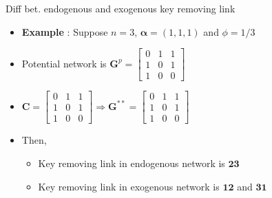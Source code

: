 \documentclass[10pt,dvipdfmx]{beamer}
\begin{document}
\begin{frame}{Diff bet. endogenous and exogenous key removing link}
\begin{itemize}
    \item {\bf{Example}} : Suppose $n=3$, $\bm{\alpha} = (1,1,1)$ and $\phi = 1/3$
    \item Potential network is $\bm{G}^p = \left[
                                    \begin{array}{ccc}
                                        0 & 1 & 1 \\
                                        1 & 0 & 1 \\
                                        1 & 0 & 0
                                    \end{array} \right]$
    \item $\bm{C} = \left[
                \begin{array}{ccc}
                    0 & 1 & 1 \\
                    1 & 0 & 1 \\
                    1 & 0 & 0
                \end{array} \right] \Rightarrow
            \bm{G}^{**} = \left[
                \begin{array}{ccc}
                    0 & 1 & 1 \\
                    1 & 0 & 1 \\
                    1 & 0 & 0
                \end{array} \right]$
    \item Then,
        \begin{itemize}
            \item Key removing link in endogenous network is $\bm{23}$
            \item Key removing link in exogenous network is $\bm{12}$ and $\bm{31}$
        \end{itemize}
\end{itemize}
\end{frame}
\end{document}
